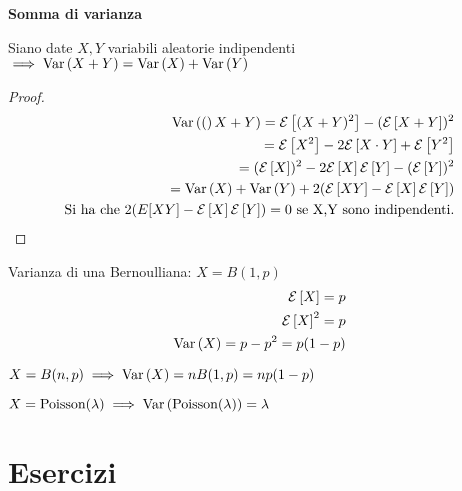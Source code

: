 \begin{defn}
	\textbf{Somma di varianza} 
	
	Siano date $ X,Y $ variabili aleatorie indipendenti $ \implies \var{X + Y} = \var{X} + \var{Y} $ 
	
	\begin{proof}
		\begin{equation*}
		\begin{aligned}
		\var(X+Y) = \E{(X+Y)^2} - (\E{X+Y})^2 \\
		= \E{X^2} - 2\E{X \cdot Y} + \E{Y^2} \\ 
		= (\E{X})^2 - 2\E{X}\E{Y} - (\E{Y})^2 \\
		= \var{X} + \var{Y} + 2(\E{XY} - \E{X}\E{Y})\\
		\text{Si ha che } 2(E[XY] - \E{X}\E{Y}) = 0 \text{ se X,Y sono indipendenti.}
		\end{aligned}
		\end{equation*}
	\end{proof}
	
\end{defn}


\begin{exmp}
	Varianza di una Bernoulliana: $ X = B(1,p) $
	\begin{equation*}
	\begin{aligned}
		\E{X} = p \\
		\E{X}^2 = p \\
		\var{X} = p-p^2 = p(1-p)
	\end{aligned}
	\end{equation*}
\end{exmp}

\begin{exmp}
	$ X = B(n,p) \implies \var{X} = nB(1,p) = np(1-p) $
\end{exmp}

\begin{exmp}
	$ X = \text{Poisson}(\lambda)  \implies  \var{\text{Poisson}(\lambda)} = \lambda $
\end{exmp}





\section{Esercizi}

